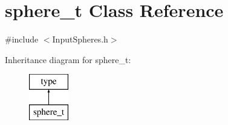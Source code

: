 \hypertarget{classsphere__t}{\section{sphere\-\_\-t Class Reference}
\label{classsphere__t}
}


{\ttfamily \#include $<$Input\-Spheres.\-h$>$}

Inheritance diagram for sphere\-\_\-t\-:\begin{figure}[H]
\begin{center}
\leavevmode
\includegraphics[height=2.000000cm]{classsphere__t}
\end{center}
\end{figure}
